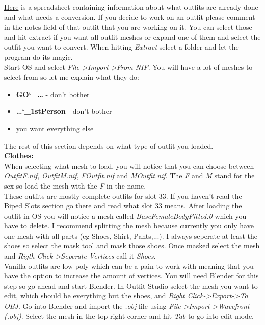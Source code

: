 \href{https://tinyurl.com/y2podp84}{Here} is a spreadsheet containing information about what outfits are already done and what 
needs a conversion. If you decide to work on an outfit please comment in the notes field of that outfit that you are working on it.
You can select those and hit extract if you want all outfit meshes or expand one of them and select the outfit you want to convert. 
When hitting \textit{Extract} select a folder and let the program do its magic.\\
Start OS and select \textit{File->Import->From NIF}. You will have a lot of meshes to select from so let me explain what they do:
\begin{itemize}
    \item \textbf{GO\char`_\dots} - don't bother
    \item \textbf{\dots\char`_1stPerson} - don't bother
    \item you want everything else
\end{itemize}
The rest of this section depends on what type of outfit you loaded.\\
\textbf{Clothes:}\\
When selecting what mesh to load, you will notice that you can choose between 
\textit{OutfitF.nif}, \textit{OutfitM.nif}, \textit{FOutfit.nif} and \textit{MOutfit.nif}. The \textit{F} and \textit{M} stand for 
the sex so load the mesh with the \textit{F} in the name.\\
These outfits are mostly complete outfits for slot 33. If you haven't read the Biped Slots section go there and read what slot 33 means.
After loading the outfit in OS you will notice a mesh called \textit{BaseFemaleBodyFitted:0} which you have to delete. I recommend 
splitting the mesh because currently you only have one mesh with all parts (eg Shoes, Shirt, Pants,...). I always seperate at least 
the shoes so select the mask tool and mask those shoes. Once masked select the mesh and \textit{Rigth Click->Seperate Vertices} call it
\textit{Shoes}.\\
Vanilla outfits are low-poly which can be a pain to work with meaning that you have the option to increase the amount of vertices.
You will need Blender for this step so go ahead and start Blender. In Outfit Studio select the mesh you want to edit, which should be
everything but the shoes, and \textit{Right Click->Export->To OBJ}. Go into Blender and import the \textit{.obj} file using 
\textit{File->Import->Wavefront (.obj)}. Select the mesh in the top right corner and hit \textit{Tab} to go into edit mode.

